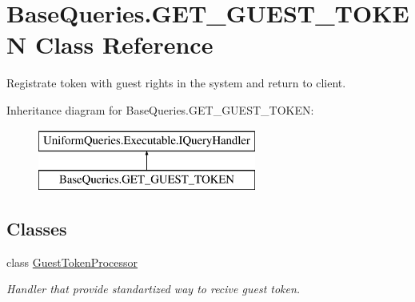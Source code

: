 \hypertarget{class_base_queries_1_1_g_e_t___g_u_e_s_t___t_o_k_e_n}{}\section{Base\+Queries.\+G\+E\+T\+\_\+\+G\+U\+E\+S\+T\+\_\+\+T\+O\+K\+EN Class Reference}
\label{class_base_queries_1_1_g_e_t___g_u_e_s_t___t_o_k_e_n}


Registrate token with guest rights in the system and return to client.  


Inheritance diagram for Base\+Queries.\+G\+E\+T\+\_\+\+G\+U\+E\+S\+T\+\_\+\+T\+O\+K\+EN\+:\begin{figure}[H]
\begin{center}
\leavevmode
\includegraphics[height=2.000000cm]{d2/da1/class_base_queries_1_1_g_e_t___g_u_e_s_t___t_o_k_e_n}
\end{center}
\end{figure}
\subsection*{Classes}
\begin{DoxyCompactItemize}
\item 
class \mbox{\hyperlink{class_base_queries_1_1_g_e_t___g_u_e_s_t___t_o_k_e_n_1_1_guest_token_processor}{Guest\+Token\+Processor}}
\begin{DoxyCompactList}\small\item\em Handler that provide standartized way to recive guest token. \end{DoxyCompactList}\end{DoxyCompactItemize}
